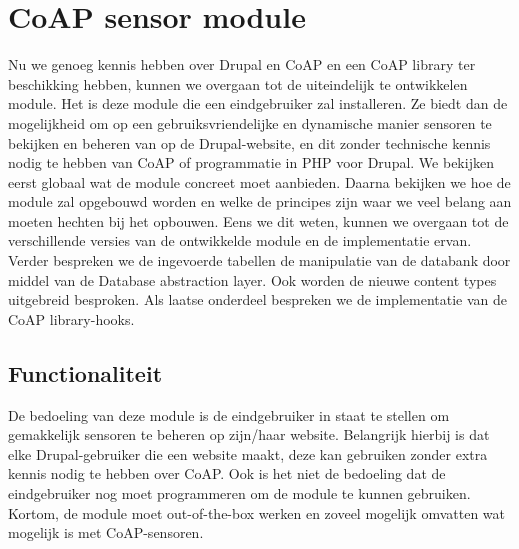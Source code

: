 \chapter{CoAP sensor module} \label{sensormodule}

Nu we genoeg kennis hebben over Drupal en CoAP en een CoAP library ter beschikking hebben, kunnen we overgaan tot de uiteindelijk te ontwikkelen module. Het is deze module die een eindgebruiker zal installeren. Ze biedt dan de mogelijkheid om op een gebruiksvriendelijke en dynamische manier sensoren te bekijken en beheren van op de Drupal-website, en dit zonder technische kennis nodig te hebben van CoAP of programmatie in PHP voor Drupal. We bekijken eerst globaal wat de module concreet moet aanbieden. Daarna bekijken we hoe de module zal opgebouwd worden en welke de principes zijn waar we veel belang aan moeten hechten bij het opbouwen. Eens we dit weten, kunnen we overgaan tot de verschillende versies van de ontwikkelde module en de implementatie ervan. Verder bespreken we de ingevoerde tabellen de manipulatie van de databank door middel van de Database abstraction layer. Ook worden de nieuwe content types uitgebreid besproken. Als laatse onderdeel bespreken we de implementatie van de CoAP library-hooks.

\section{Functionaliteit}

De bedoeling van deze module is de eindgebruiker in staat te stellen om gemakkelijk sensoren te beheren op zijn/haar website. Belangrijk hierbij is dat elke Drupal-gebruiker die een website maakt, deze kan gebruiken zonder extra kennis nodig te hebben over CoAP. Ook is het niet de bedoeling dat de eindgebruiker nog moet programmeren om de module te kunnen gebruiken. Kortom, de module moet out-of-the-box werken en zoveel mogelijk omvatten wat mogelijk is met CoAP-sensoren.\\


